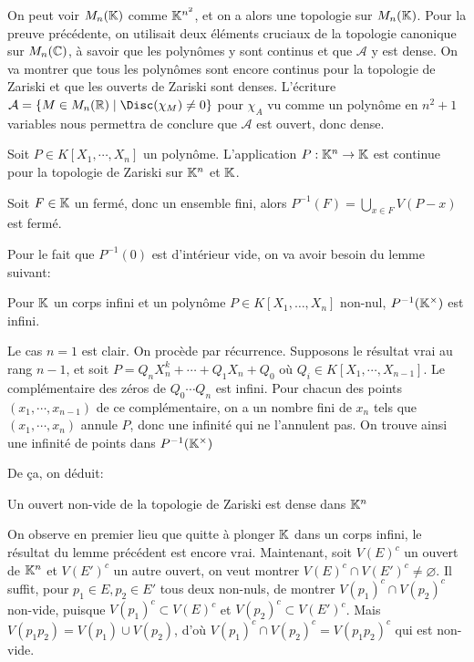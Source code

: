 \documentclass{article}
\begin{document}
On peut voir $M_n(\mathbb{K})$ comme $\mathbb{K}^{n^2}$, et on a alors une topologie sur $M_n(\mathbb{K})$. Pour la preuve précédente, on utilisait deux éléments cruciaux de la topologie canonique sur $M_n(\mathbb{C})$, à savoir que les polynômes y sont continus et que $\mathcal{A}$ y est dense. On va montrer que tous les polynômes sont encore continus pour la topologie de Zariski et que les ouverts de Zariski sont denses. L'écriture $\mathcal{A} = \{M \in M_n(\bR) \mid \Disc(\chi_M) \neq 0\}$ pour $\chi_A$ vu comme un polynôme en $n^2 + 1$ variables nous permettra de conclure que $\mathcal{A}$ est ouvert, donc dense.

\begin{proposition}
    Soit $P \in K[X_1, \cdots, X_n]$ un polynôme. L'application $P: \mathbb{K}^n \to \mathbb{K}$ est continue pour la topologie de Zariski sur $\mathbb{K}^n$ et $\mathbb{K}$.
\end{proposition}

\begin{preuve}
    Soit $F \in \mathbb{K}$ un fermé, donc un ensemble fini, alors $P^{-1}(F) = \bigcup_{x \in F}{V(P-x)}$ est fermé.
\end{preuve}

Pour le fait que $P^{-1}(0)$ est d'intérieur vide, on va avoir besoin du lemme suivant:
\begin{lemme}
    Pour $\mathbb{K}$ un corps infini et un polynôme $P \in K[X_1, \ldots, X_n]$ non-nul, $P^{-1}(\mathbb{K}^\times)$ est infini.\\
\end{lemme}

\begin{preuve}
    Le cas $n = 1$ est clair. On procède par récurrence. Supposons le résultat vrai au rang $n-1$, et soit $P = Q_nX_n^k + \cdots + Q_1X_n + Q_0$ où $Q_i \in K[X_1, \cdots, X_{n-1}]$. Le complémentaire des zéros de $Q_0\cdots Q_n$ est infini. Pour chacun des points $(x_1, \cdots, x_{n-1})$ de ce complémentaire, on a un nombre fini de $x_n$ tels que $(x_1, \cdots, x_n)$ annule $P$, donc une infinité qui ne l'annulent pas. On trouve ainsi une infinité de points dans $P^{-1}(\mathbb{K}^\times)$\\
\end{preuve}

De ça, on déduit:

\begin{proposition}
    Un ouvert non-vide de la topologie de Zariski est dense dans $\mathbb{K}^n$
\end{proposition}

\begin{preuve}
    On observe en premier lieu que quitte à plonger $\mathbb{K}$ dans un corps infini, le résultat du lemme précédent est encore vrai. Maintenant, soit $V(E)^c$ un ouvert de $\mathbb{K}^n$ et $V(E')^c$ un autre ouvert, on veut montrer $V(E)^c \cap V(E')^c \neq \varnothing$. Il suffit, pour $p_1 \in E, p_2 \in E'$ tous deux non-nuls, de montrer $V(p_1)^c \cap V(p_2)^c$ non-vide, puisque $V(p_1)^c \subset V(E)^c$ et $V(p_2)^c \subset V(E')^c$. Mais $V(p_1p_2) = V(p_1) \cup V(p_2)$, d'où $V(p_1)^c \cap V(p_2)^c = V(p_1p_2)^c$ qui est non-vide.\\
\end{preuve}
\end{document}

